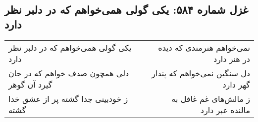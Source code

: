 \begin{center}
\section*{غزل شماره ۵۸۴: یکی گولی همی‌خواهم که در دلبر نظر دارد}
\label{sec:0584}
\begin{longtable}{l p{0.5cm} r}
یکی گولی همی‌خواهم که در دلبر نظر دارد
&&
نمی‌خواهم هنرمندی که دیده در هنر دارد
\\
دلی همچون صدف خواهم که در جان گیرد آن گوهر
&&
دل سنگین نمی‌خواهم که پندار گهر دارد
\\
ز خودبینی جدا گشته پر از عشق خدا گشته
&&
ز مالش‌های غم غافل به مالنده عبر دارد
\\
\end{longtable}
\end{center}

